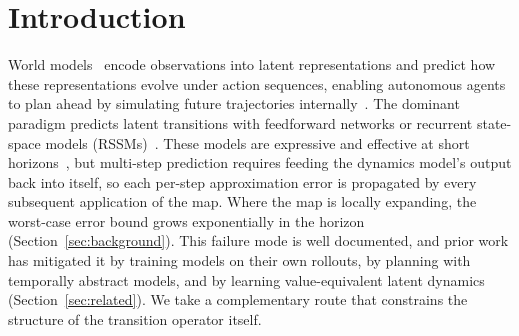 \documentclass[10pt]{article} %
\begin{document}
\section{Introduction}
\label{sec:intro}
World models~\citep{Ha2018} encode observations into latent representations and predict how these representations evolve under action sequences, enabling autonomous agents to plan ahead by simulating future trajectories internally~\citep{schmidhuber1990making,Sager2025Agents}.
The dominant paradigm predicts latent transitions with feedforward networks or recurrent state-space models (RSSMs)~\citep{Hafner2019Planet,Hafner2025,Hansen2023}.
These models are expressive and effective at short horizons~\citep{Hansen2023}, but multi-step prediction requires feeding the dynamics model's output back into itself, so each per-step approximation error is propagated by every subsequent application of the map. Where the map is locally expanding, the worst-case error bound grows exponentially in the horizon (Section~\ref{sec:background}). This failure mode is well documented, and prior
work has mitigated it by training models on their own rollouts, by planning with temporally abstract models, and by learning value-equivalent latent dynamics (Section~\ref{sec:related}). We take a complementary route that constrains the structure of the transition operator itself.
\end{document}
